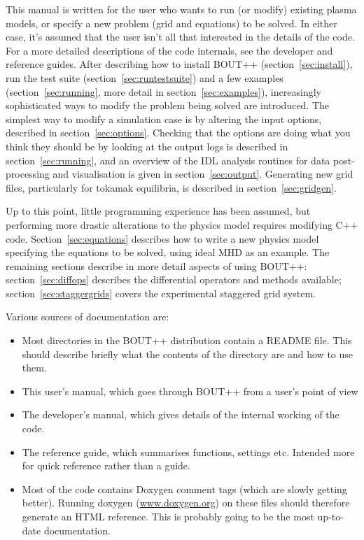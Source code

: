 \documentclass[12pt]{article}
\begin{document}
This manual is written for the user who wants to run (or modify) existing
plasma models, or specify a new problem (grid and equations) to be solved. In
either case, it's assumed that the user isn't all that interested in the
details of the code.  For a more detailed descriptions of the code internals,
see the developer and reference guides.  After describing how to install BOUT++
(section~\ref{sec:install}), run the test suite
(section~\ref{sec:runtestsuite}) and a few examples (section~\ref{sec:running},
more detail in section~\ref{sec:examples}), increasingly sophisticated ways to
modify the problem being solved are introduced.  The simplest way to modify a
simulation case is by altering the input options, described in
section~\ref{sec:options}. Checking that the options are doing what you think
they should be by looking at the output logs is described in
section~\ref{sec:running}, and an overview of the IDL analysis routines for
data post-processing and visualisation is given in section~\ref{sec:output}.
Generating new grid files, particularly for tokamak equilibria, is described in
section~\ref{sec:gridgen}.

Up to this point, little programming experience has been assumed, but
performing more drastic alterations to the physics model requires modifying C++
code.  Section~\ref{sec:equations} describes how to write a new physics model
specifying the equations to be solved, using ideal MHD as an example. The
remaining sections describe in more detail aspects of using BOUT++:
section~\ref{sec:diffops} describes the differential operators and methods
available; section~\ref{sec:staggergrids} covers the experimental staggered
grid system.

Various sources of documentation are:
%
\begin{itemize}
\item Most directories in the BOUT++ distribution contain a README file. This
    should describe briefly what the contents of the directory are and how to
    use them.
\item This user's manual, which goes through BOUT++ from a user's point of view
\item The developer's manual, which gives details of the internal working of
    the code.
\item The reference guide, which summarises functions, settings etc. Intended more for
quick reference rather than a guide.
\item Most of the code contains Doxygen comment tags (which are slowly getting better).
Running doxygen (\url{www.doxygen.org}) on these files should therefore
generate an HTML reference. This is probably going to be the most up-to-date
documentation.
\end{itemize}
%
\end{document}
